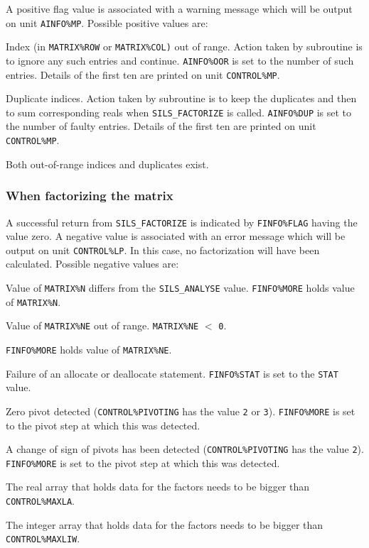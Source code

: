 \documentclass{galahad}
\newcommand{\packagename}{SILS}
\begin{document}
A positive flag value is associated with a warning message 
 which will  be output on unit {\tt AINFO\%MP}. Possible positive values are: 
 
\begin{description} 
 
 Index (in {\tt MATRIX\%ROW} or {\tt MATRIX\%COL)} out of range. 
 Action taken by 
 subroutine is to ignore any such entries and continue. {\tt AINFO\%OOR} 
 is set to the number of such entries. Details of the first ten are 
 printed on unit {\tt CONTROL\%MP}. 
 
 Duplicate indices. 
       Action taken by subroutine is to keep the duplicates and then to 
       sum corresponding reals when {\tt \packagename\_FACTORIZE} is called. 
       {\tt AINFO\%DUP} is set to the number of 
       faulty entries. Details of the first ten are printed on unit  
       {\tt CONTROL\%MP}. 
 
 Both out-of-range indices and duplicates exist. 
 
\end{description} 
 
\subsubsection{When factorizing the matrix}\label{errorfact}
A successful return from {\tt \packagename\_FACTORIZE} is indicated by 
 {\tt FINFO\%FLAG} having the value zero.  A negative value is 
 associated with an error message which will  be output on unit 
 {\tt CONTROL\%LP}. In this case, no factorization will have been 
 calculated.  Possible negative values are: 
 
 
\begin{description} 
 Value of {\tt MATRIX\%N} differs from the {\tt \packagename\_ANALYSE} 
value. {\tt FINFO\%MORE} holds value of {\tt MATRIX\%N}. 
 
 Value of {\tt MATRIX\%NE} out of range.  {\tt MATRIX\%NE} $<$ {\tt 0}.
  
{\tt FINFO\%MORE} holds value of {\tt MATRIX\%NE}. 
 
 Failure of an allocate or deallocate statement. {\tt FINFO\%STAT} 
 is set to the {\tt STAT} value.  
 
 Zero pivot detected ({\tt CONTROL\%PIVOTING} has the value 
{\tt 2} or {\tt 3}). 
{\tt FINFO\%MORE} is set to the pivot step at which this was detected. 
 
 A change of sign of pivots has been detected  ({\tt CONTROL\%PIVOTING} 
has the value {\tt 2}). {\tt FINFO\%MORE} 
is set to the pivot step at which this was detected. 
 
 The real array that holds data for the factors 
  needs to be bigger than {\tt CONTROL\%MAXLA}.  
 
 The integer array that holds data for the factors 
 needs to be bigger than {\tt CONTROL\%MAXLIW}.  
 
\end{description} 
 
\end{document}

